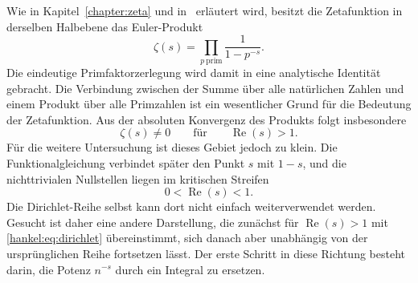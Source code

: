 Wie in Kapitel~\ref{chapter:zeta} und in~\cite{hankel:apostol} erläutert wird, besitzt die Zetafunktion in derselben Halbebene das Euler-Produkt
%
\begin{equation}
\zeta(s)
=
\prod_{p\ \mathrm{prim}}
\frac{1}{1-p^{-s}}.
\label{hankel:eq:eulerprodukt}
\end{equation}
Die eindeutige Primfaktorzerlegung wird damit in eine analytische Identität gebracht. 
%
Die Verbindung zwischen der Summe über alle natürlichen Zahlen und einem Produkt über alle Primzahlen ist ein wesentlicher Grund für die Bedeutung der Zetafunktion. 
Aus der absoluten Konvergenz des Produkts folgt insbesondere
\begin{equation}
\zeta(s)\neq0
\qquad
\text{für}
\qquad
\operatorname{Re}(s)>1.
\label{hankel:eq:nullstellenfrei}
\end{equation}
Für die weitere Untersuchung ist dieses Gebiet jedoch zu klein. 
Die Funktionalgleichung verbindet später den Punkt $s$ mit $1-s$, und die nichttrivialen Nullstellen liegen im kritischen Streifen
\begin{equation}
0<\operatorname{Re}(s)<1.
\label{hankel:eq:kritischer-streifen-einleitung}
\end{equation}
Die Dirichlet-Reihe selbst kann dort nicht einfach weiterverwendet werden.
Gesucht ist daher eine andere Darstellung, die zunächst für
$\operatorname{Re}(s)>1$ mit \eqref{hankel:eq:dirichlet} übereinstimmt, sich danach aber unabhängig von der ursprünglichen Reihe fortsetzen lässt.
Der erste Schritt in diese Richtung besteht darin, die Potenz $n^{-s}$ durch ein Integral zu ersetzen.
